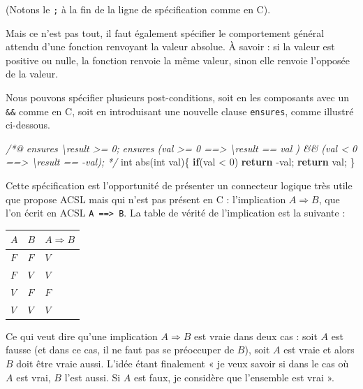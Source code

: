 \documentclass[12pt,francais,]{scrbook}
\newenvironment{Shaded}{}{}
\newcommand{\KeywordTok}[1]{\textcolor[rgb]{0.00,0.44,0.13}{\textbf{{#1}}}}
\newcommand{\DataTypeTok}[1]{\textcolor[rgb]{0.56,0.13,0.00}{{#1}}}
\newcommand{\DecValTok}[1]{\textcolor[rgb]{0.25,0.63,0.44}{{#1}}}
\newcommand{\CommentTok}[1]{\textcolor[rgb]{0.38,0.63,0.69}{\textit{{#1}}}}
\newcommand{\NormalTok}[1]{{#1}}
\begin{document}
(Notons le \texttt{;} à la fin de la ligne de spécification comme en C).

Mais ce n'est pas tout, il faut également spécifier le comportement
général attendu d'une fonction renvoyant la valeur absolue. À savoir :
si la valeur est positive ou nulle, la fonction renvoie la même valeur,
sinon elle renvoie l'opposée de la valeur.

Nous pouvons spécifier plusieurs post-conditions, soit en les composants
avec un \texttt{\&\&} comme en C, soit en introduisant une nouvelle
clause \texttt{ensures}, comme illustré ci-dessous.

\begin{footnotesize}\begin{Shaded}
\begin{Highlighting}[]
\CommentTok{/*@}
\CommentTok{  ensures \textbackslash{}result >= 0;}
\CommentTok{  ensures (val >= 0 ==> \textbackslash{}result == val ) && }
\CommentTok{          (val <  0 ==> \textbackslash{}result == -val);}
\CommentTok{*/}
\DataTypeTok{int} \NormalTok{abs(}\DataTypeTok{int} \NormalTok{val)\{}
  \KeywordTok{if}\NormalTok{(val < }\DecValTok{0}\NormalTok{) }\KeywordTok{return} \NormalTok{-val;}
  \KeywordTok{return} \NormalTok{val;}
\NormalTok{\}}
\end{Highlighting}
\end{Shaded}\end{footnotesize}

Cette spécification est l'opportunité de présenter un connecteur logique
très utile que propose ACSL mais qui n'est pas présent en C :
l'implication \(A \Rightarrow B\), que l'on écrit en ACSL
\texttt{A\ ==\textgreater{}\ B}. La table de vérité de l'implication est
la suivante :

\begin{longtable}[]{@{}lll@{}}
\toprule
\(A\) & \(B\) & \(A \Rightarrow B\)\tabularnewline
\midrule
\endhead
\(F\) & \(F\) & \(V\)\tabularnewline
\(F\) & \(V\) & \(V\)\tabularnewline
\(V\) & \(F\) & \(F\)\tabularnewline
\(V\) & \(V\) & \(V\)\tabularnewline
\bottomrule
\end{longtable}

Ce qui veut dire qu'une implication \(A \Rightarrow B\) est vraie dans
deux cas : soit \(A\) est fausse (et dans ce cas, il ne faut pas se
préoccuper de \(B\)), soit \(A\) est vraie et alors \(B\) doit être
vraie aussi. L'idée étant finalement « je veux savoir si dans le cas où
\(A\) est vrai, \(B\) l'est aussi. Si \(A\) est faux, je considère que
l'ensemble est vrai ».
\end{document}
